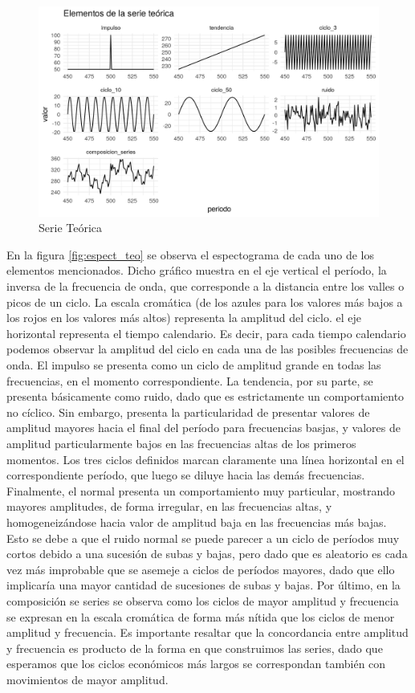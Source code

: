 \documentclass[a4paper]{article}
\begin{document}
\begin{figure}[H]
	\centering
	\includegraphics[width=\linewidth]{serie_teorica.PNG}
	\caption{Serie Teórica} \label{fig:serie_teorica}
\end{figure}

En la figura \ref{fig:espect_teo} se observa el espectograma de cada uno de los elementos mencionados. Dicho gráfico muestra en el eje vertical el período, la inversa de la frecuencia de onda, que corresponde a la distancia entre los valles o picos de un ciclo. La escala cromática (de los azules para los valores más bajos a los rojos en los valores más altos) representa la amplitud del ciclo. el eje horizontal representa el tiempo calendario. Es decir, para cada tiempo calendario podemos observar la amplitud del ciclo en cada una de las posibles frecuencias de onda. El impulso se presenta como un ciclo de amplitud grande en todas las frecuencias, en el momento correspondiente. La tendencia, por su parte, se presenta básicamente como ruido, dado que es estrictamente un comportamiento no cíclico. Sin embargo, presenta la particularidad de presentar valores de amplitud mayores hacia el final del período para frecuencias basjas, y valores de amplitud particularmente bajos en las frecuencias altas de los primeros momentos.
Los tres ciclos definidos marcan claramente una línea horizontal en el correspondiente período, que luego se diluye hacia las demás frecuencias. Finalmente, el normal presenta un comportamiento muy particular, mostrando mayores amplitudes, de forma irregular, en las frecuencias altas, y homogeneizándose hacia valor de amplitud baja en las frecuencias más bajas. Esto se debe a que el ruido normal se puede parecer a un ciclo de períodos muy cortos debido a una sucesión de subas y bajas, pero dado que es aleatorio es cada vez más improbable que se asemeje a ciclos de períodos mayores, dado que ello implicaría una mayor cantidad de sucesiones de subas y bajas. 
Por último, en la composición se series se observa como los ciclos de mayor amplitud y frecuencia se expresan en la escala cromática de forma más nítida que los ciclos de menor amplitud y frecuencia. Es importante resaltar que la concordancia entre amplitud y frecuencia es producto de la forma en que construimos las series, dado que esperamos que los ciclos económicos más largos se correspondan también con movimientos de mayor amplitud.
\end{document}

